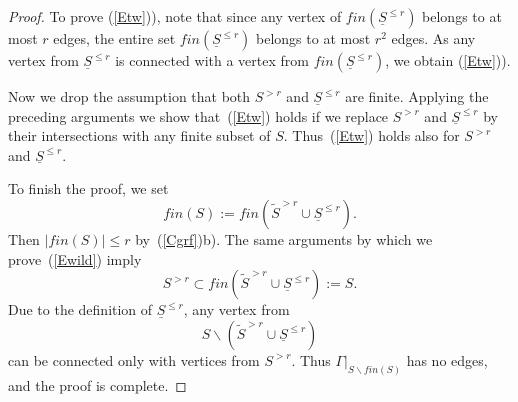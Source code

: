 \documentclass[10pt]{amsart}\oddsidemargin -1mm \evensidemargin -1mm \topmargin -15mm\headheight5mm \headsep 3.5mm \textheight 245mm\textwidth 170mm %
\theoremstyle{definition}\newtheorem{theorem}{Theorem}[section]\newtheorem{lemma}[theorem]{Lemma}\newtheorem{remark}[theorem]{Remark}\newtheorem{proposition}[theorem]{Proposition}\newtheorem{corollary}[theorem]{Corollary}\newtheorem{definition}[theorem]{Definition}\newtheorem{Ex}[theorem]{Example}
\begin{document}
\begin{proof}
To prove (\ref{Etw})), note that since any vertex of $fin(\underline S^{\le r})$ belongs to at most $r$ edges, the entire set $fin(\underline S^{\le r})$ belongs to at most $r^2$ edges. As any vertex from $\underline S^{\le r}$ is connected with a vertex from $fin(\underline S^{\le r})$, we obtain (\ref{Etw})).

Now we drop the assumption that both $S^{>r}$ and
$\underline S^{\le r}$ are finite. Applying the preceding arguments
we show that~(\ref{Etw}) holds if we replace $S^{>r}$ and
$\underline S^{\le r}$ by their intersections with any finite subset of $S$.
Thus~(\ref{Etw}) holds also for $S^{>r}$ and $\underline S^{\le r}$.

To finish the proof, we set
$$fin(S):=fin(\widetilde S^{>r}\cup\underline S^{\le r}).$$
Then $|fin(S)|\le r$ by~(\ref{Cgrf})b). The same arguments by which  we prove~(\ref{Ewild}) imply$$S^{>r}\subset
fin(\widetilde S^{>r}\cup\underline S^{\le r}):=S.$$ Due to the
definition of $\underline S^{\le r}$, any vertex from $$S\backslash
(\widetilde S^{>r}\cup\underline S^{\le r})$$ can be connected only
with vertices from $S^{>r}$. Thus $\Gamma|_{S\backslash fin(S)}$ has no
edges, and the proof is complete.
\end{proof}
\end{document}
